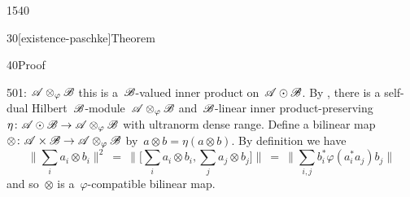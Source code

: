 \begin{parsec}{1540}
\begin{point}{30}[existence-paschke]{Theorem}
\begin{point}{40}{Proof}
\begin{point}{50}{1: $\mathscr{A} \otimes_\varphi \mathscr{B}$}
this is a~$\mathscr{B}$-valued inner product on~$\mathscr{A} \odot \mathscr{B}$.
By ,
    there is a self-dual Hilbert~$\mathscr{B}$-module~$\mathscr{A}\otimes_\varphi \mathscr{B}$
    and~$\mathscr{B}$-linear inner product-preserving
    $\eta\colon \mathscr{A} \odot \mathscr{B} \to \mathscr{A} \otimes_\varphi \mathscr{B}$
    with ultranorm dense range.
Define a bilinear map~$\otimes \colon \mathscr{A} \times \mathscr{B} \to \mathscr{A} \otimes_\varphi \mathscr{B}$
    by~$a \otimes b = \eta(a \otimes b)$.
By definition we have
\begin{equation*}
\bigl\| \sum_i a_i \otimes b_i \bigr\|^2
    \ =\  \bigl\|\bigl[ \sum_i a_i\otimes b_i, \sum_j a_j \otimes b_j \bigr]\bigr\|
    \ =\  \bigl\|\sum_{i,j} b_i^* \varphi(a_i^*a_j) b_j\bigr\|
\end{equation*}
and so~$\otimes$ is a~$\varphi$-compatible bilinear map.


\end{point}
\end{point}
\end{point}
\end{parsec}
